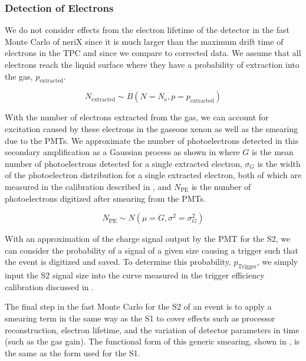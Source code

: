 \subsubsection{Detection of Electrons}


We do not consider effects from the electron lifetime of the detector in the fast Monte Carlo of neriX since it is much larger than the maximum drift time of electrons in the TPC and since we compare to corrected data.  We assume that all electrons reach the liquid surface where they have a probability of extraction into the gas, $p_{\textrm{extracted}}$.


\begin{equation}
        \label{eqn:nerix_binomial_ee}
        N_{\textrm{extracted}} \sim B \left( N= N_{\textrm{e}}, p=p_{\textrm{extracted}} \right)
\end{equation}


With the number of electrons extracted from the gas, we can account for excitation caused by these electrons in the gaseous xenon as well as the smearing due to the PMTs.  We approximate the number of photoelectrons detected in this secondary amplification as a Gaussian process as shown in  where $G$ is the mean number of photoelectrons detected for a single extracted electron, $\sigma_G$ is the width of the photoelectron distribution for a single extracted electron, both of which are measured in the calibration described in , and $N_{\textrm{PE}}$ is the number of photoelectrons digitized after smearing from the PMTs.

\begin{equation}
        \label{eqn:nerix_gas_gain}
        N_{\textrm{PE}} \sim N(\mu=G , \sigma^2=\sigma_G^2)
\end{equation}


With an approximation of the charge signal output by the PMT for the S2, we can consider the probability of a signal of a given size causing a trigger such that the event is digitized and saved.  To determine this probability, $p_{\textrm{Trigger}}$, we simply input the S2 signal size into the curve measured in the trigger efficiency calibration discussed in .

The final step in the fast Monte Carlo for the S2 of an event is to apply a smearing term in the same way as the S1 to cover effects such as processor reconstruction, electron lifetime, and the variation of detector parameters in time (such as the gas gain).  The functional form of this generic smearing, shown in , is the same as the form used for the S1.


